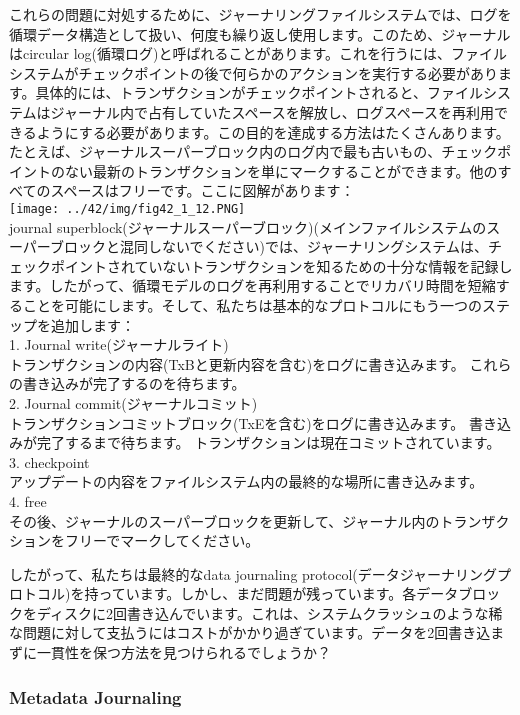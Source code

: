 これらの問題に対処するために、ジャーナリングファイルシステムでは、ログを循環データ構造として扱い、何度も繰り返し使用します。このため、ジャーナルはcircular
log(循環ログ)と呼ばれることがあります。これを行うには、ファイルシステムがチェックポイントの後で何らかのアクションを実行する必要があります。具体的には、トランザクションがチェックポイントされると、ファイルシステムはジャーナル内で占有していたスペースを解放し、ログスペースを再利用できるようにする必要があります。この目的を達成する方法はたくさんあります。たとえば、ジャーナルスーパーブロック内のログ内で最も古いもの、チェックポイントのない最新のトランザクションを単にマークすることができます。他のすべてのスペースはフリーです。ここに図解があります：\\
\texttt{[image: ../42/img/fig42\_1\_12.PNG]}\\
journal
superblock(ジャーナルスーパーブロック)(メインファイルシステムのスーパーブロックと混同しないでください)では、ジャーナリングシステムは、チェックポイントされていないトランザクションを知るための十分な情報を記録します。したがって、循環モデルのログを再利用することでリカバリ時間を短縮することを可能にします。そして、私たちは基本的なプロトコルにもう一つのステップを追加します：\\
1. Journal write(ジャーナルライト)\\
トランザクションの内容(TxBと更新内容を含む)をログに書き込みます。
これらの書き込みが完了するのを待ちます。\\
2. Journal commit(ジャーナルコミット)\\
トランザクションコミットブロック(TxEを含む)をログに書き込みます。
書き込みが完了するまで待ちます。
トランザクションは現在コミットされています。\\
3. checkpoint\\
アップデートの内容をファイルシステム内の最終的な場所に書き込みます。\\
4. free\\
その後、ジャーナルのスーパーブロックを更新して、ジャーナル内のトランザクションをフリーでマークしてください。

したがって、私たちは最終的なdata journaling
protocol(データジャーナリングプロトコル)を持っています。しかし、まだ問題が残っています。各データブロックをディスクに2回書き込んでいます。これは、システムクラッシュのような稀な問題に対して支払うにはコストがかかり過ぎています。データを2回書き込まずに一貫性を保つ方法を見つけられるでしょうか？

\hypertarget{metadata-journaling}{%
\subsubsection*{Metadata Journaling}\label{metadata-journaling}}

